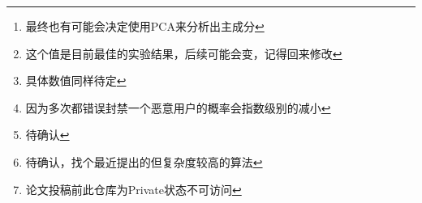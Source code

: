 \documentclass[conference]{IEEEtran}
\begin{document}
\begin{abstract}
In this paper，我们提出了一种针对ViT的两阶段的上下文感知轻量级恶意梯度识别方法来提升恶意梯度检测时的效率和鲁棒性。通过放大池化技术\footnote{最终也有可能会决定使用PCA来分析出主成分}和特征层提取技术，在减少计算量的同时去除无效的梯度信息，从而在提升了检测效率的同时提升了恶意检测的鲁棒性。Specifically，对于用户上传上来的梯度信息，首先进行PCA算法对数据进行降维，将数据量下降到原来的4\%\footnote{这个值是目前最佳的实验结果，后续可能会变，记得回来修改}，去除无用信息并保留有效信息，同时为后续算法降低了需要处理的数据量大小。随后我们使用隔离森林算法随机挑选剩下梯度中的1000\footnote{具体数值同样待定}个特征，进一步降低恶意识别部分的复杂度。由于已经使用过主成分分析算法，因此隔离森林算法的输入数据特征都比较明显，因此可以纯随机挑选要计算的维度。最后，我们使用主观逻辑模型\cite{Subjective_Logic_Model}对用户评分并在聚合的过程中附以权重，这样使得聚合结果更加有效的同时减少了由于随机导致的错误封禁\footnote{因为多次都错误封禁一个恶意用户的概率会指数级别的减小}。这样，在ViT这种具有大量参数的模型下，也能够进行很好的联邦学习训练并杜绝可能的潜在的攻击。

我们在CIFAR-10、CIFAR-100、xxx\footnote{待确认}上做了有关模型效率以及有关识别鲁棒性的实验，在处理时间上相比先进的xx\footnote{待确认，找个最近提出的但复杂度较高的算法}算法降低了80\%。模型鲁棒性方面，单纯的隔离森林的识别准确率非常低，这是由梯度中有大量的接近0的值所导致的。而对于使用放大池化来减少计算量并增强鲁棒性的算法\cite{betterTogether}，虽然能极大程度地减少计算量，但在ViT的拜占庭攻击下对鲁棒性会起到相反的效果。相比于单纯的PCA算法，我们的识别准确率由70\%提升到了95\%。

我们将其命名为ViT-MGI并发布了其源代码，以方便该领域的未来研究：\href{https://github.com/LetMeFly666/FLDefinder}{https://github.com/LetMeFly666/FLDefinder}\footnote{论文投稿前此仓库为Private状态不可访问}。








\end{abstract}
\end{document}
